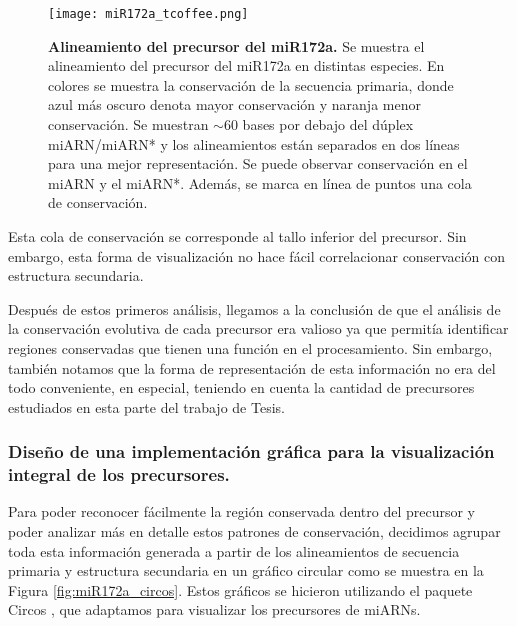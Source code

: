\begin{landscape}
    \begin{figure}[htbp!] 
        \centering    
        \texttt{[image: miR172a\_tcoffee.png]}
        \caption[Alineamiento del precursor del miR172a.]{
        \textbf{Alineamiento del precursor del miR172a.}
        Se muestra el alineamiento del precursor del miR172a en distintas especies. 
        En colores se muestra la conservación de la secuencia primaria, donde azul más oscuro denota mayor conservación y naranja menor conservación.
        Se muestran $\sim$60 bases por debajo del dúplex miARN/miARN* y los alineamientos están separados en dos líneas para una mejor representación.
        Se puede observar conservación en el miARN y el miARN*.
        Además, se marca en línea de puntos una cola de conservación.}
         \label{fig:miR172a_tcoffee}
    \end{figure}
\end{landscape}


Esta cola de conservación se corresponde al tallo inferior del precursor.
Sin embargo, esta forma de visualización no hace fácil correlacionar conservación con estructura secundaria.

Después de estos primeros análisis, llegamos a la conclusión de que el análisis de la conservación evolutiva de cada precursor era valioso ya que permitía identificar regiones conservadas que tienen una función en el procesamiento.
Sin embargo, también notamos que la forma de representación de esta información no era del todo conveniente, en especial, teniendo en cuenta la cantidad de precursores estudiados en esta parte del trabajo de Tesis.


\subsubsection{Diseño de una implementación gráfica para la visualización integral de los precursores.}

Para poder reconocer fácilmente la región conservada dentro del precursor y poder analizar más en detalle estos patrones de conservación, decidimos agrupar toda esta información 
generada a partir de los alineamientos de secuencia primaria y estructura secundaria en un gráfico circular como se muestra en la Figura \ref{fig:miR172a_circos}.
Estos gráficos se hicieron utilizando el paquete Circos \citep{pmid19541911}, que adaptamos para visualizar los precursores de miARNs.
 
